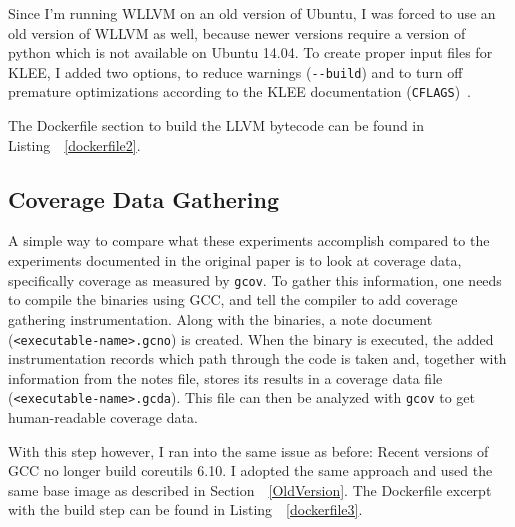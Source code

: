 \documentclass{article}
\let\savedCite=\cite
\renewcommand{\cite}{\unskip~\savedCite}
\let\savedRef=\ref
\renewcommand{\ref}{\unskip~\savedRef}
\begin{document}
Since I'm running WLLVM on an old version of Ubuntu, I was forced to use an old version of WLLVM as well, because newer versions require a version of python which is not available on Ubuntu 14.04. To create proper input files for KLEE, I added two options, to reduce warnings (\lstinline{--build}) and to turn off premature optimizations according to the KLEE documentation (\lstinline{CFLAGS})\cite{KLEETutorial}.

The Dockerfile section to build the LLVM bytecode can be found in Listing~\ref{dockerfile2}.



\subsection{Coverage Data Gathering}
\label{gcov}

A simple way to compare what these experiments accomplish compared to the experiments documented in the original paper is to look at coverage data, specifically coverage as measured by \lstinline{gcov}. To gather this information, one needs to compile the binaries using GCC, and tell the compiler to add coverage gathering instrumentation. Along with the binaries, a note document (\lstinline{<executable-name>.gcno}) is created. When the binary is executed, the added instrumentation records which path through the code is taken and, together with information from the notes file, stores its results in a coverage data file (\lstinline{<executable-name>.gcda}). This file can then be analyzed with \lstinline{gcov} to get human-readable coverage data.

With this step however, I ran into the same issue as before: Recent versions of GCC no longer build coreutils 6.10. I adopted the same approach and used the same base image as described in Section~\ref{OldVersion}. The Dockerfile excerpt with the build step can be found in Listing~\ref{dockerfile3}.


\end{document}
